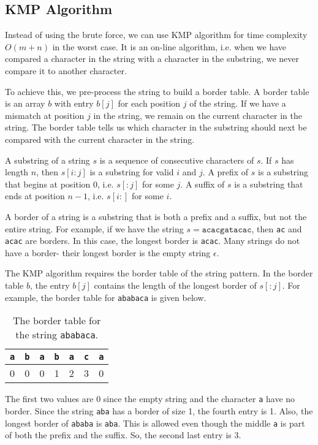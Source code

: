 \documentclass[a4paper, openany]{memoir}
\begin{document}
\subsection{KMP Algorithm}
Instead of using the brute force, we can use KMP algorithm for time complexity $O(m+n)$ in the worst case. It is an on-line algorithm, i.e. when we have compared a character in the string with a character in the substring, we never compare it to another character. 

To achieve this, we pre-process the string to build a border table. A border table is an array $b$ with entry $b[j]$ for each position $j$ of the string. If we have a mismatch at position $j$ in the string, we remain on the current character in the string. The border table tells us which character in the substring should next be compared with the current character in the string.

A substring of a string $s$ is a sequence of consecutive characters of $s$. If $s$ has length $n$, then $s[i:j]$ is a substring for valid $i$ and $j$. A prefix of $s$ is a substring that begins at position 0, i.e. $s[:j]$ for some $j$. A suffix of $s$ is a substring that ends at position $n-1$, i.e. $s[i:]$ for some $i$. 

A border of a string is a substring that is both a prefix and a suffix, but not the entire string. For example, if we have the string $s = \texttt{acacgatacac}$, then \texttt{ac} and \texttt{acac} are borders. In this case, the longest border is \texttt{acac}. Many strings do not have a border- their longest border is the empty string $\epsilon$.

The KMP algorithm requires the border table of the string pattern. In the border table $b$, the entry $b[j]$ contains the length of the longest border of $s[:j]$. For example, the border table for \texttt{ababaca} is given below.
\begin{table}[H]
    \centering
    \begin{tabular}{|c|c|c|c|c|c|c|}
        \hline
        \texttt{a} & \texttt{b} & \texttt{a} & \texttt{b} & \texttt{a} & \texttt{c} & \texttt{a} \\
        \hline
        0 & 0 & 0 & 1 & 2 & 3 & 0 \\
        \hline
    \end{tabular}
    \caption{The border table for the string \texttt{ababaca}.}
\end{table}
\noindent The first two values are 0 since the empty string and the character \texttt{a} have no border. Since the string \texttt{aba} has a border of size 1, the fourth entry is 1. Also, the longest border of \texttt{ababa} is \texttt{aba}. This is allowed even though the middle \texttt{a} is part of both the prefix and the suffix. So, the second last entry is 3.
\end{document}
